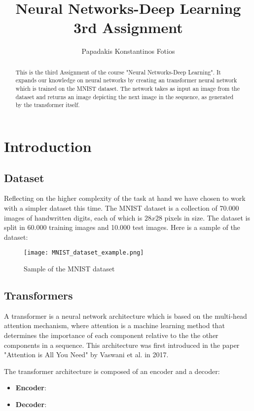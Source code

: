 \documentclass[lettersize,journal]{IEEEtran}
\begin{document}
\title{Neural Networks-Deep Learning \\ 3rd Assignment}
\author{Papadakis Konstantinos Fotios}
\maketitle

\begin{abstract}
This is the third Assignment of the course "Neural Networks-Deep Learning". It expands our 
knowledge on neural networks by creating an transformer neural network which is trained on 
the MNIST dataset. The network takes as input an image from the dataset and returns an image
depicting the next image in the sequence, as generated by the transformer itself.  
\end{abstract}

\section{Introduction}
\subsection{Dataset}
Reflecting on the higher complexity of the task at hand we have chosen to work with a simpler
dataset this time. The MNIST dataset is a collection of 70.000 images of handwritten digits,
each of which is $28x28$ pixels in size. The dataset is split in 60.000 training images and
10.000 test images. Here is a sample of the dataset:
\begin{figure}[H]   
    \centering
    \texttt{[image: MNIST\_dataset\_example.png]}
    \caption{Sample of the MNIST dataset}
\end{figure}

\subsection{Transformers}
A transformer is a neural network architecture which is based on the multi-head attention
mechanism, where attention is a machine learning method that determines the importance of
each component relative to the the other components in a sequence. This architecture was 
first introduced in the paper "Attention is All You Need" by Vaswani et al. in 2017.

\smallskip

The transformer architecture is composed of an encoder and a decoder:
\begin{itemize}
    \item \textbf{Encoder}: 
    \item \textbf{Decoder}: 
\end{itemize}
\end{document}
